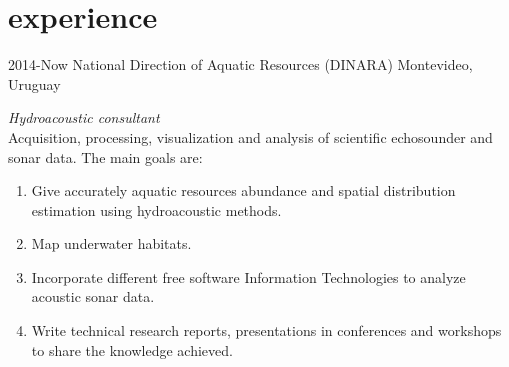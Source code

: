 \documentclass[]{friggeri-cv} %
\begin{document}
\section{experience}
\begin{entrylist}

\entry
{2014-Now}
{National Direction of Aquatic Resources (DINARA)}
{Montevideo, Uruguay}
{\emph{Hydroacoustic consultant} \\ Acquisition, processing, visualization and analysis of scientific echosounder and sonar data. The main goals are:
	\begin{enumerate}
		\item Give accurately aquatic resources abundance and spatial distribution estimation using hydroacoustic methods.
		\item Map underwater habitats.
		\item Incorporate different free software Information Technologies to analyze acoustic sonar data.
		\item Write technical research reports, presentations in conferences and workshops to share the knowledge achieved.\\   
	\end{enumerate}
	}
\end{entrylist}
\end{document}
